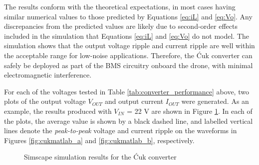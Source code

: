  The results conform with the theoretical expectations, in most cases having similar numerical values to those predicted by Equations \ref{eq:iL} and \ref{eq:Vo}. Any discrepancies from the predicted values are likely due to second-order effects included in the simulation that Equations \ref{eq:iL} and \ref{eq:Vo} do not model. The simulation shows that the output voltage ripple and current ripple are well within the acceptable range for low-noise applications. Therefore, the Ćuk converter can safely be deployed as part of the \acrshort{BMS} circuitry onboard the drone, with minimal electromagnetic interference.


For each of the voltages tested in Table \ref{tab:converter_performance} above, two plots of the output voltage $V_{OUT}$ and output current $I_{OUT}$ were generated. As an example, the results produced with $V_{IN}$ = 22 V are shown in Figure \ref{fig:cukmatlab}. In each of the plots, the average value is shown by a black dashed line, and labelled vertical lines denote the \textit{peak-to-peak} voltage and current ripple on the waveforms in Figures \ref{fig:cukmatlab_a} and \ref{fig:cukmatlab_b}, respectively. 

\begin{figure}[H]
\centering
{}

\vspace{0.1cm} %

\caption{Simscape simulation results for the Ćuk converter}
\label{fig:cukmatlab}
\end{figure}

